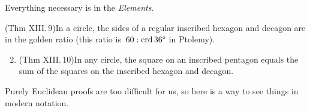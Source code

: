 \goodbreak




Everything necessary is in the \emph{Elements.}

\begin{thm*}{}{}
\exstart (Thm XIII.\,9)\lstsp In a circle, the sides of a regular inscribed hexagon and decagon are in the golden ratio (this ratio is\ $60:\crd \ang{36}$ in Ptolemy).
\begin{enumerate}\setcounter{enumi}{1}
  \item (Thm XIII.\,10)\lstsp In any circle, the square on an inscribed pentagon equals the sum of the squares on the inscribed hexagon and decagon.
\end{enumerate}
\end{thm*}

Purely Euclidean proofs are too difficult for us, so here is a way to see things in modern notation.

